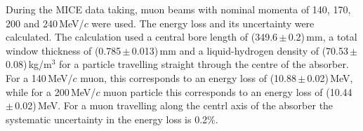 During the MICE data taking, muon beams with nominal momenta of 140,
170, 200 and 240\,MeV/$c$ were used.
The energy loss and its uncertainty were calculated.
The calculation used a central bore length of
(349.6\,$\mathrm{\pm}$\,0.2)\,mm, a total window thickness of
(0.785\,$\mathrm{\pm}$\,0.013)\,mm and a liquid-hydrogen density of
(70.53\,$\mathrm{\pm}$\,0.08)\,kg/m$^{3}$ for a particle travelling
straight through the centre of the absorber. 
For a 140\,MeV/$c$ muon, this corresponds to an energy loss of
(10.88\,$\mathrm{\pm}$\,0.02)\,MeV, while for a 200\,MeV/$c$ muon 
particle this corresponds to an energy loss of
(10.44\,$\mathrm{\pm}$\,0.02)\,MeV.
For a muon travelling along the centrl axis of the absorber the
systematic uncertainty in the energy loss is 0.2\%.
